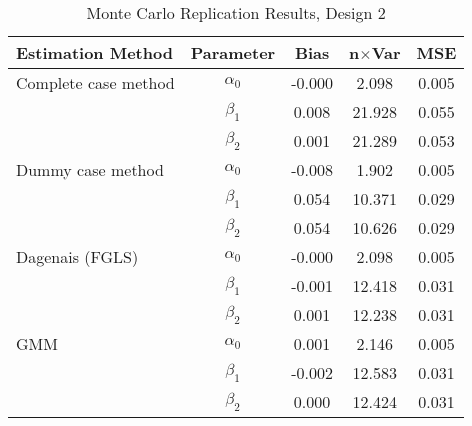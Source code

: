 \begin{table}
\centering
\caption{Monte Carlo Replication Results, Design 2}
\label{table:MCReplicationResultsDesign2}
\begin{tabular}{lcccc}
\toprule
Estimation Method & Parameter & Bias & n$\times$Var & MSE \\
\midrule
Complete case method & $\alpha_0$ & -0.000 & 2.098 & 0.005 \\
 & $\beta_1$ & 0.008 & 21.928 & 0.055 \\
 & $\beta_2$ & 0.001 & 21.289 & 0.053 \\
Dummy case method & $\alpha_0$ & -0.008 & 1.902 & 0.005 \\
 & $\beta_1$ & 0.054 & 10.371 & 0.029 \\
 & $\beta_2$ & 0.054 & 10.626 & 0.029 \\
Dagenais (FGLS) & $\alpha_0$ & -0.000 & 2.098 & 0.005 \\
 & $\beta_1$ & -0.001 & 12.418 & 0.031 \\
 & $\beta_2$ & 0.001 & 12.238 & 0.031 \\
GMM & $\alpha_0$ & 0.001 & 2.146 & 0.005 \\
 & $\beta_1$ & -0.002 & 12.583 & 0.031 \\
 & $\beta_2$ & 0.000 & 12.424 & 0.031 \\
\bottomrule
\end{tabular}
\end{table}
